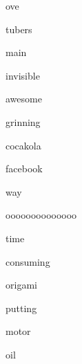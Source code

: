 \documentclass[varwidth]{standalone}
\begin{document}
\begin{CJK*}{UTF8}{gbsn}
{{{\colorbox{red!13.86461353302002}{\strut ove}
\colorbox{red!10.372268676757812}{\strut tubers}
\colorbox{red!11.266912460327148}{\strut main}
\colorbox{red!8.898624420166016}{\strut invisible}
\colorbox{red!5.320908546447754}{\strut awesome}
\colorbox{red!5.15750789642334}{\strut grinning}
\colorbox{red!13.378225326538086}{\strut cocakola}
\colorbox{red!10.172683715820312}{\strut facebook}
\colorbox{red!8.994182586669922}{\strut way}
\colorbox{red!13.896846771240234}{\strut oooooooooooooo}
\colorbox{red!8.96793270111084}{\strut time}
\colorbox{red!4.076328277587891}{\strut consuming}
\colorbox{red!13.187621116638184}{\strut origami}
\colorbox{red!12.284822463989258}{\strut putting}
\colorbox{red!9.978588104248047}{\strut motor}
\colorbox{red!8.37432861328125}{\strut oil}

}}}
\end{CJK*}
\end{document}
